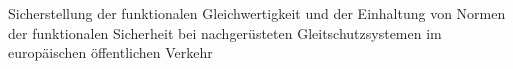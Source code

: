Sicherstellung der funktionalen Gleichwertigkeit und der Einhaltung von Normen der funktionalen Sicherheit bei nachgerüsteten Gleitschutzsystemen im europäischen öffentlichen Verkehr